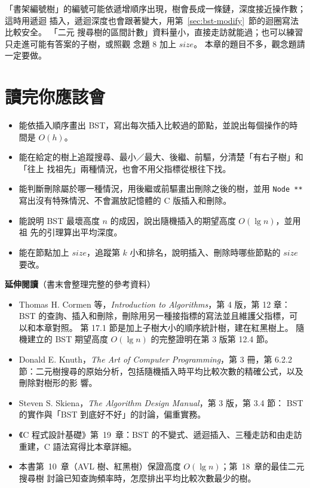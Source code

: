 「書架編號樹」的編號可能依遞增順序出現，樹會長成一條鏈，深度接近操作數；這時用遞迴
插入，遞迴深度也會跟著變大，用第~\ref{sec:bst-modify}~節的迴圈寫法比較安全。 「二元
搜尋樹的區間計數」資料量小，直接走訪就能過；也可以練習只走進可能有答案的子樹，或照觀
念題 8 加上 $\mathit{size}$。 本章的題目不多，觀念題請一定要做。

\section{讀完你應該會}
\label{sec:bst-checklist}

\begin{itemize}
\item 能依插入順序畫出 BST，寫出每次插入比較過的節點，並說出每個操作的時間是
$O(h)$。
\item 能在給定的樹上追蹤搜尋、最小／最大、後繼、前驅，分清楚「有右子樹」和「往上
找祖先」兩種情況，也會不用父指標從根往下找。
\item 能判斷刪除屬於哪一種情況，用後繼或前驅畫出刪除之後的樹，並用 \texttt{Node **}
寫出沒有特殊情況、不會漏放記憶體的 C 版插入和刪除。
\item 能說明 BST 最壞高度 $n$ 的成因，說出隨機插入的期望高度 $O(\lg n)$，並用祖
先的引理算出平均深度。
\item 能在節點加上 $\mathit{size}$，追蹤第 $k$ 小和排名，說明插入、刪除時哪些節點的
$\mathit{size}$ 要改。
\end{itemize}

\textbf{延伸閱讀}（書末會整理完整的參考資料）

\begin{itemize}
\item Thomas H. Cormen 等，\textit{Introduction to Algorithms}，第 4 版，第 12 章：
BST 的查詢、插入和刪除，刪除用另一種接指標的寫法並且維護父指標，可以和本章對照。
第 17.1 節是加上子樹大小的順序統計樹，建在紅黑樹上。 隨機建立的 BST 期望高度
$O(\lg n)$ 的完整證明在第 3 版第 12.4 節。
\item Donald E. Knuth，\textit{The Art of Computer Programming}，第 3 冊，第 6.2.2
節：二元樹搜尋的原始分析，包括隨機插入時平均比較次數的精確公式，以及刪除對樹形的影
響。
\item Steven S. Skiena，\textit{The Algorithm Design Manual}，第 3 版，第 3.4 節：
BST 的實作與「BST 到底好不好」的討論，偏重實務。
\item 《C 程式設計基礎》第~19~章：BST 的不變式、遞迴插入、三種走訪和由走訪重建，C
語法寫得比本章詳細。
\item 本書第~10~章（AVL 樹、紅黑樹）保證高度 $O(\lg n)$；第~18~章的最佳二元搜尋樹
討論已知查詢頻率時，怎麼排出平均比較次數最少的樹。
\end{itemize}

